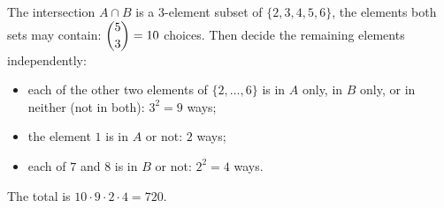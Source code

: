 The intersection $A\cap B$ is a $3$-element subset of $\{2,3,4,5,6\}$, the elements both sets may contain: $\dbinom{5}{3}=10$ choices. Then decide the remaining elements independently:
\begin{itemize}
\item each of the other two elements of $\{2,\dots,6\}$ is in $A$ only, in $B$ only, or in neither (not in both): $3^2=9$ ways;
\item the element $1$ is in $A$ or not: $2$ ways;
\item each of $7$ and $8$ is in $B$ or not: $2^2=4$ ways.
\end{itemize}
The total is $10\cdot9\cdot2\cdot4=\boxed{720}$.
